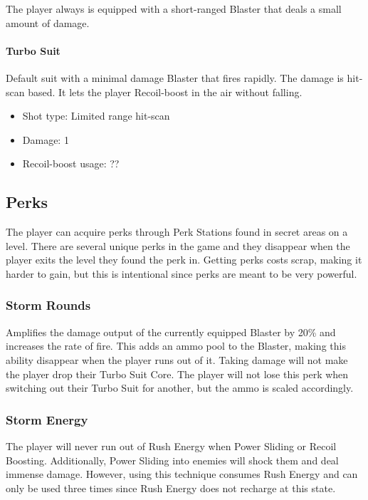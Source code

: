 \documentclass[12pt]{article}
\begin{document}
The player always is equipped with a short-ranged Blaster that deals a small amount of damage.

\paragraph{Turbo Suit} 

Default suit with a minimal damage Blaster that fires rapidly. The damage is hit-scan based. It lets the player Recoil-boost in the air without falling.

\begin{itemize}
	\item Shot type: Limited range hit-scan
	\item Damage: 1
	\item Recoil-boost usage: ??
\end{itemize}

\subsection{Perks}

The player can acquire perks through Perk Stations found in secret areas on a level. There are several unique perks in the game and they disappear when the player exits the level they found the perk in. Getting perks costs scrap, making it harder to gain, but this is intentional since perks are meant to be very powerful. 

\subsubsection{Storm Rounds}

Amplifies the damage output of the currently equipped Blaster by 20\% and increases the rate of fire. This adds an ammo pool to the Blaster, making this ability disappear when the player runs out of it. Taking damage will not make the player drop their Turbo Suit Core. The player will not lose this perk when switching out their Turbo Suit for another, but the ammo is scaled accordingly.

\subsubsection{Storm Energy}

The player will never run out of Rush Energy when Power Sliding or Recoil Boosting. Additionally, Power Sliding into enemies will shock them and deal immense damage. However, using this technique consumes Rush Energy and can only be used three times since Rush Energy does not recharge at this state. 
\end{document}

